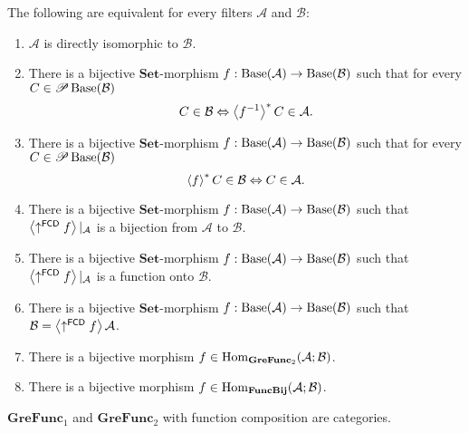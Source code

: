 \begin{cor}
The following are equivalent for every filters $\mathcal{A}$ and
$\mathcal{B}$:
\begin{enumerate}
\item $\mathcal{A}$ is directly isomorphic to $\mathcal{B}$.
\item There is a bijective $\mathbf{Set}$-morphism $f:\operatorname{Base}(\mathcal{A})\rightarrow\operatorname{Base}(\mathcal{B})$
such that for every $C\in\mathscr{P}\operatorname{Base}(\mathcal{B})$
\[
C\in\mathcal{B}\Leftrightarrow\left\langle f^{-1}\right\rangle ^{\ast}C\in\mathcal{A}.
\]

\item There is a bijective $\mathbf{Set}$-morphism $f:\operatorname{Base}(\mathcal{A})\rightarrow\operatorname{Base}(\mathcal{B})$
such that for every $C\in\mathscr{P}\operatorname{Base}(\mathcal{B})$
\[
\left\langle f\right\rangle ^{\ast}C\in\mathcal{B}\Leftrightarrow C\in\mathcal{A}.
\]

\item There is a bijective $\mathbf{Set}$-morphism $f:\operatorname{Base}(\mathcal{A})\rightarrow\operatorname{Base}(\mathcal{B})$
such that $\left\langle \uparrow^{\mathsf{FCD}}f\right\rangle|_{\mathcal{A}}$ is a
bijection from $\mathcal{A}$ to $\mathcal{B}$.
\item There is a bijective $\mathbf{Set}$-morphism $f:\operatorname{Base}(\mathcal{A})\rightarrow\operatorname{Base}(\mathcal{B})$
such that $\left\langle \uparrow^{\mathsf{FCD}}f\right\rangle|_{\mathcal{A}}$ is a
function onto $\mathcal{B}$.
\item There is a bijective $\mathbf{Set}$-morphism $f:\operatorname{Base}(\mathcal{A})\rightarrow\operatorname{Base}(\mathcal{B})$
such that $\mathcal{B}=\left\langle \uparrow^{\mathsf{FCD}}f\right\rangle\mathcal{A}$.
\item There is a bijective morphism $f\in\operatorname{Hom}_{\mathbf{GreFunc}_{2}}(\mathcal{A};\mathcal{B})$.
\item There is a bijective morphism $f\in\operatorname{Hom}_{\mathbf{FuncBij}}(\mathcal{A};\mathcal{B})$.
\end{enumerate}
\end{cor}
\begin{prop}
$\mathbf{GreFunc}_{1}$ and $\mathbf{GreFunc}_{2}$ with function
composition are categories.\end{prop}
